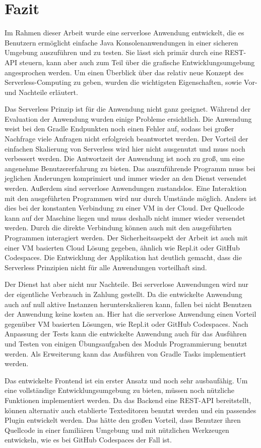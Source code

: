 \chapter{Fazit}

Im Rahmen dieser Arbeit wurde eine serverlose Anwendung entwickelt,
die es Benutzern ermöglicht einfache Java Konsolenanwendungen in
einer sicheren Umgebung auszuführen und zu testen. Sie
lässt sich primär durch eine REST-API steuern, kann aber auch
zum Teil über die grafische Entwicklungsumgebung angesprochen
werden. Um einen Überblick über das relativ neue Konzept des
Serverless-Computing zu geben, wurden die wichtigsten Eigenschaften,
sowie Vor- und Nachteile erläutert.

Das Serverless Prinzip ist für die Anwendung nicht ganz
geeignet. Während der Evaluation der Anwendung wurden einige Probleme
ersichtlich. Die Anwendung weist bei den Gradle Endpunkten noch
einen Fehler auf, sodass bei großer Nachfrage viele Anfragen
nicht erfolgreich beantwortet werden. Der Vorteil der
einfachen Skalierung von Serverless wird hier nicht ausgenutzt und
muss noch verbessert werden. Die Antwortzeit der Anwendung ist noch zu groß,
um eine angenehme Benutzererfahrung zu bieten. Das
auszuführende Programm muss bei jeglichen Änderungen
komprimiert und immer wieder an den Dienst versendet
werden. Außerdem sind serverlose Anwendungen zustandslos.
Eine Interaktion mit den ausgeführten Programmen wird nur durch
Umstände möglich. Anders ist dies bei der konstanten Verbindung zu
einer VM in der Cloud. Der Quellcode kann auf der Maschine
liegen und muss deshalb nicht immer wieder versendet werden.
Durch die direkte Verbindung können auch mit den ausgeführten Programmen
interagiert werden. Der Sicherheitsaspekt der Arbeit ist auch mit einer VM basierten
Cloud Lösung gegeben, ähnlich wie Repl.it oder GitHub Codespaces.
Die Entwicklung der Applikation hat deutlich gemacht,
dass die Serverless Prinzipien nicht für alle Anwendungen vorteilhaft sind.

Der Dienst hat aber nicht nur Nachteile.
Bei serverlose Anwendungen wird nur der eigentliche Verbrauch
in Zahlung gestellt. Da die entwickelte Anwendung auch
auf null aktive Instanzen herunterskalieren kann, fallen bei nicht Benutzen
der Anwendung keine kosten an. Hier hat die serverlose Anwendung einen
Vorteil gegenüber VM basierten Lösungen, wie Repl.it oder
GitHub Codespaces. Nach Anpassung der Tests kann die entwickelte
Anwendung auch für das Ausführen und Testen von 
einigen Übungsaufgaben des Moduls Programmierung benutzt werden.
Als Erweiterung kann das Ausführen von Gradle Tasks implementiert
werden.

Das entwickelte Frontend ist ein erster Ansatz und noch sehr
ausbaufähig. Um eine vollständige Entwicklungsumgebung zu bieten,
müssen noch nützliche Funktionen implementiert werden.
Da das Backend eine REST-API bereitstellt, können
alternativ auch etablierte Texteditoren benutzt werden und ein passendes
Plugin entwickelt werden. Das hätte den großen Vorteil, dass Benutzer ihren
Quellcode in einer familiären Umgebung und mit nützlichen Werkzeugen entwickeln,
wie es bei GitHub Codespaces der Fall ist.


 
